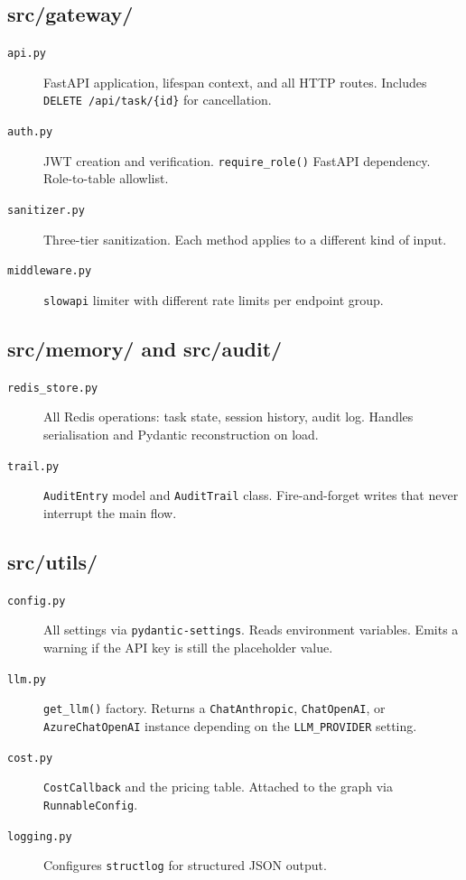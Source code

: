 \documentclass[12pt,a4paper]{article}
\begin{document}
\subsection{src/gateway/}

\begin{description}
  \item[\texttt{api.py}] FastAPI application, lifespan context, and all HTTP routes. Includes \texttt{DELETE /api/task/\{id\}} for cancellation.
  \item[\texttt{auth.py}] JWT creation and verification. \texttt{require\_role()} FastAPI dependency. Role-to-table allowlist.
  \item[\texttt{sanitizer.py}] Three-tier sanitization. Each method applies to a different kind of input.
  \item[\texttt{middleware.py}] \texttt{slowapi} limiter with different rate limits per endpoint group.
\end{description}

\subsection{src/memory/ and src/audit/}

\begin{description}
  \item[\texttt{redis\_store.py}] All Redis operations: task state, session history, audit log. Handles serialisation and Pydantic reconstruction on load.
  \item[\texttt{trail.py}] \texttt{AuditEntry} model and \texttt{AuditTrail} class. Fire-and-forget writes that never interrupt the main flow.
\end{description}

\subsection{src/utils/}

\begin{description}
  \item[\texttt{config.py}] All settings via \texttt{pydantic-settings}. Reads environment variables. Emits a warning if the API key is still the placeholder value.
  \item[\texttt{llm.py}] \texttt{get\_llm()} factory. Returns a \texttt{ChatAnthropic}, \texttt{ChatOpenAI}, or \texttt{AzureChatOpenAI} instance depending on the \texttt{LLM\_PROVIDER} setting.
  \item[\texttt{cost.py}] \texttt{CostCallback} and the pricing table. Attached to the graph via \texttt{RunnableConfig}.
  \item[\texttt{logging.py}] Configures \texttt{structlog} for structured JSON output.
\end{description}
\end{document}
